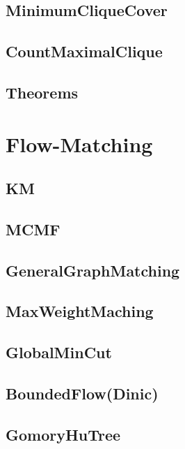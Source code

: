 	\subsection{MinimumCliqueCover}
	
	\subsection{CountMaximalClique}
	
	\subsection{Theorems}
	
\section{Flow-Matching}
	\subsection{KM}
	
	\subsection{MCMF}
	
	\subsection{GeneralGraphMatching}
	
	\subsection{MaxWeightMaching}
	
	\subsection{GlobalMinCut}
	
	\subsection{BoundedFlow(Dinic)}
	
	\subsection{GomoryHuTree}
	
